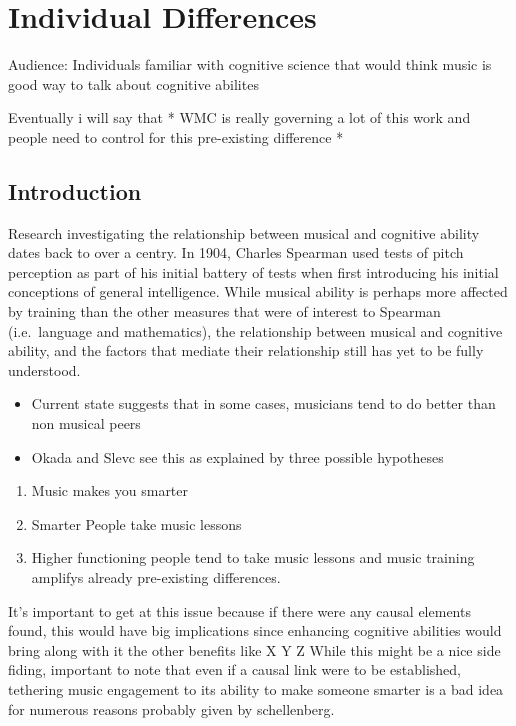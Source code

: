 \documentclass[]{book}
\providecommand{\tightlist}{%
  \setlength{\itemsep}{0pt}\setlength{\parskip}{0pt}}
\theoremstyle{definition}
\theoremstyle{definition}
\theoremstyle{definition}
\theoremstyle{remark}
\begin{document}
\hypertarget{individual-differences}{%
\chapter{Individual Differences}\label{individual-differences}}

Audience: Individuals familiar with cognitive science that would think
music is good way to talk about cognitive abilites

Eventually i will say that * WMC is really governing a lot of this work
and people need to control for this pre-existing difference *

\hypertarget{introduction}{%
\section{Introduction}\label{introduction}}

Research investigating the relationship between musical and cognitive
ability dates back to over a centry. In 1904, Charles Spearman
\citep{spearmanGeneralIntelligenceObjectively1904} used tests of pitch
perception as part of his initial battery of tests when first
introducing his initial conceptions of general intelligence. While
musical ability is perhaps more affected by training than the other
measures that were of interest to Spearman (i.e.~language and
mathematics), the relationship between musical and cognitive ability,
and the factors that mediate their relationship still has yet to be
fully understood.

\begin{itemize}
\tightlist
\item
  Current state suggests that in some cases, musicians tend to do better
  than non musical peers
\item
  Okada and Slevc see this as explained by three possible hypotheses
\end{itemize}

\begin{enumerate}
\def\labelenumi{\arabic{enumi}.}
\tightlist
\item
  Music makes you smarter
\item
  Smarter People take music lessons
\item
  Higher functioning people tend to take music lessons and music
  training amplifys already pre-existing differences.
\end{enumerate}

It's important to get at this issue because if there were any causal
elements found, this would have big implications since enhancing
cognitive abilities would bring along with it the other benefits like X
Y Z While this might be a nice side fiding, important to note that even
if a causal link were to be established, tethering music engagement to
its ability to make someone smarter is a bad idea for numerous reasons
probably given by schellenberg.
\end{document}
